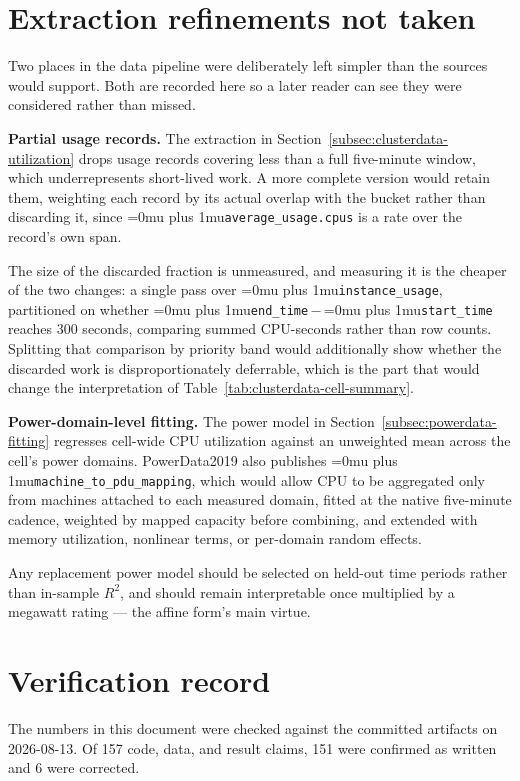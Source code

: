 ﻿\documentclass[12pt]{article}
\newcommand{\codepath}[1]{{\Urlmuskip=0mu plus 1mu\relax\nolinkurl{#1}}}
\begin{document}
\section{Extraction refinements not taken}
\label{app:not-taken}

Two places in the data pipeline were deliberately left simpler than the sources
would support. Both are recorded here so a later reader can see they were
considered rather than missed.

\textbf{Partial usage records.} The extraction in
Section~\ref{subsec:clusterdata-utilization} drops usage records covering less
than a full five-minute window, which underrepresents short-lived work. A more
complete version would retain them, weighting each record by its actual overlap
with the bucket rather than discarding it, since
\codepath{average_usage.cpus} is a rate over the record's own span.

The size of the discarded fraction is unmeasured, and measuring it is the
cheaper of the two changes: a single pass over \codepath{instance_usage},
partitioned on whether \codepath{end_time}\,\(-\)\,\codepath{start_time} reaches
300 seconds, comparing summed CPU-seconds rather than row counts. Splitting that
comparison by priority band would additionally show whether the discarded work
is disproportionately deferrable, which is the part that would change the
interpretation of Table~\ref{tab:clusterdata-cell-summary}.

\textbf{Power-domain-level fitting.} The power model in
Section~\ref{subsec:powerdata-fitting} regresses cell-wide CPU utilization
against an unweighted mean across the cell's power domains. PowerData2019 also
publishes \codepath{machine_to_pdu_mapping}, which would allow CPU to be
aggregated only from machines attached to each measured domain, fitted at the
native five-minute cadence, weighted by mapped capacity before combining, and
extended with memory utilization, nonlinear terms, or per-domain random effects.

Any replacement power model should be selected on held-out time periods rather
than in-sample \(R^2\), and should remain interpretable once multiplied by a
megawatt rating --- the affine form's main virtue.

\section{Verification record}
\label{app:verification}

The numbers in this document were checked against the committed artifacts on
2026-08-13. Of 157 code, data, and result claims, 151 were confirmed as written
and 6 were corrected.
\end{document}
